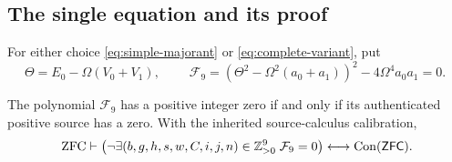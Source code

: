 \subsection{The single equation and its proof}

For either choice \eqref{eq:simple-majorant} or
\eqref{eq:complete-variant}, put
\begin{equation}
 \Theta=E_0-\Omega(V_0+V_1),\qquad
 \boxed{\;
 \mathcal F_9=
 \left(\Theta^2-\Omega^2(a_0+a_1)\right)^2
       -4\Omega^4a_0a_1=0.\;}
 \label{eq:saturated-nine-equation}
\end{equation}

\begin{theorem}
\label{thm:saturated-nine}
The polynomial \(\mathcal F_9\) has a positive integer zero if and only if
its authenticated positive source has a zero. With the inherited
source-calculus calibration,
\[
 \mathrm{ZFC}\vdash
 \left(
   \neg\exists(b,g,h,s,w,C,i,j,n)\in\mathbb Z_{>0}^9\;
       \mathcal F_9=0
 \right)
 \longleftrightarrow\operatorname{Con}(\mathsf{ZFC}).
\]
\end{theorem}

